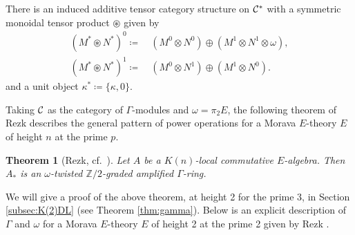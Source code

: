 \documentclass{gtpart}
\newtheorem{thm}{Theorem}
\theoremstyle{definition}
\theoremstyle{remark}
\newcommand{\mb}[1]{\mathbb{#1}}
\newcommand{\CC}{{\cal C}}
\newcommand{\BZ}{{\mb Z}}
\newcommand{\G}{\Gamma}
\newcommand{\K}{\kappa}
\newcommand{\ce}{\coloneqq}
\numberwithin{equation}{section}
\numberwithin{thm}{section}
\begin{document}
There is an induced additive tensor category structure on $\CC^*$ with a 
symmetric monoidal tensor product $\circledast$ given by 
\begin{equation*}
\begin{split}
 (M^* \circledast N^*)^0 \ce & ~ (M^0 \otimes N^0) \oplus (M^1 \otimes N^1 \otimes \omega), \\
 (M^* \circledast N^*)^1 \ce & ~ (M^0 \otimes N^1) \oplus (M^1 \otimes N^0).  
\end{split}
\end{equation*}
and a unit object $\K^* \ce \{ \K,0 \}$.  

Taking $\CC$ as the category of $\G$-modules and $\omega = \pi_2 E$, the 
following theorem of Rezk describes the general pattern of power 
operations for a Morava $E$-theory $E$ of height $n$ at the prime $p$.  

\begin{thm}[Rezk, cf.~\cite{slides, cong}]
\label{thm:rezk}
 Let $A$ be a $K(n)$-local commutative $E$-algebra.  Then $A_*$ is an 
 $\omega$-twisted $\BZ/2$-graded amplified $\G$-ring.  
\end{thm}

We will give a proof of the above theorem, at height 2 for the prime 3, 
in Section \ref{subsec:K(2)DL} (see Theorem \ref{thm:gamma}).  Below is 
an explicit description of $\G$ and $\omega$ for a Morava $E$-theory $E$ 
of height 2 at the prime 2 given by Rezk \cite[Section 2]{h2p2}.  
\end{document}
